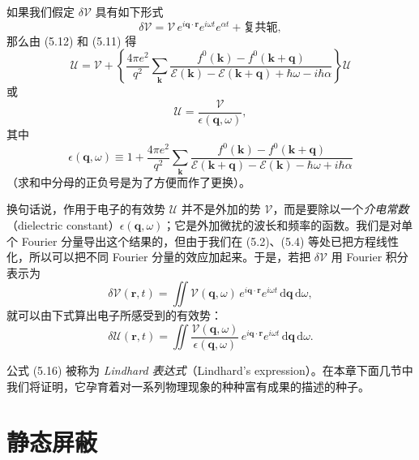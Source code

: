 如果我们假定 $\delta\mathcal{V}$ 具有如下形式
\begin{equation*}
\delta\mathcal{V}=\mathcal{V}\,e^{i\mathbf{q}\cdot\mathbf{r}}e^{i\omega t}e^{\alpha t}+\text{复共轭},
\tag{5.13}
\end{equation*}
那么由 (5.12) 和 (5.11) 得
\begin{equation*}
\mathcal{U}=\mathcal{V}+\left\{\frac{4\pi e^{2}}{q^{2}}\sum_{\mathbf{k}}\frac{f^{0}(\mathbf{k})-f^{0}(\mathbf{k}+\mathbf{q})}{\mathcal{E}(\mathbf{k})-\mathcal{E}(\mathbf{k}+\mathbf{q})+\hbar\omega-i\hbar\alpha}\right\}\mathcal{U}
\tag{5.14}
\end{equation*}
或
\begin{equation*}
\mathcal{U}=\frac{\mathcal{V}}{\epsilon(\mathbf{q},\omega)},
\tag{5.15}
\end{equation*}
其中
\begin{equation*}
\epsilon(\mathbf{q},\omega)\equiv 1+\frac{4\pi e^{2}}{q^{2}}\sum_{\mathbf{k}}\frac{f^{0}(\mathbf{k})-f^{0}(\mathbf{k}+\mathbf{q})}{\mathcal{E}(\mathbf{k}+\mathbf{q})-\mathcal{E}(\mathbf{k})-\hbar\omega+i\hbar\alpha}
\tag{5.16}
\end{equation*}
（求和中分母的正负号是为了方便而作了更换）。

换句话说，作用于电子的有效势 $\mathcal{U}$ 并不是外加的势 $\mathcal{V}$，而是要除以一个\emph{介电常数}（dielectric constant）$\epsilon(\mathbf{q},\omega)$；它是外加微扰的波长和频率的函数。我们是对单个 Fourier 分量导出这个结果的，但由于我们在 (5.2)、(5.4) 等处已把方程线性化，所以可以把不同 Fourier 分量的效应加起来。于是，若把 $\delta\mathcal{V}$ 用 Fourier 积分表示为
\begin{equation*}
\delta\mathcal{V}(\mathbf{r},t)=\iint\mathcal{V}(\mathbf{q},\omega)\,e^{i\mathbf{q}\cdot\mathbf{r}}e^{i\omega t}\,\mathrm{d}\mathbf{q}\,\mathrm{d}\omega,
\tag{5.17}
\end{equation*}
就可以由下式算出电子所感受到的有效势：
\begin{equation*}
\delta\mathcal{U}(\mathbf{r},t)=\iint\frac{\mathcal{V}(\mathbf{q},\omega)}{\epsilon(\mathbf{q},\omega)}\,e^{i\mathbf{q}\cdot\mathbf{r}}e^{i\omega t}\,\mathrm{d}\mathbf{q}\,\mathrm{d}\omega.
\tag{5.18}
\end{equation*}

公式 (5.16) 被称为 \emph{Lindhard 表达式}（Lindhard's expression）。在本章下面几节中我们将证明，它孕育着对一系列物理现象的种种富有成果的描述的种子。

\section{静态屏蔽}

